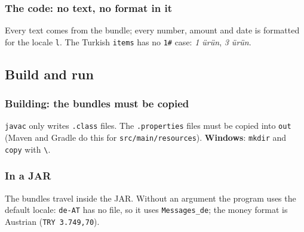 \documentclass[aspectratio=169,10pt,compress]{beamer}
\newcommand{\win}{\textbf{Windows}}
\begin{document}
\begin{frame}[t,fragile] \frametitle{The code: no text, no format in it}
  \vspace{0.1em}
  \small Every text comes from the bundle; every number, amount and date is formatted for the locale \texttt{l}.
  The Turkish \texttt{items} has no \texttt{1\#} case: \emph{1 ürün}, \emph{3 ürün}.
\end{frame}

\subsection[Build]{Build and run}




\begin{frame}[t,fragile] \frametitle{Building: the bundles must be copied}

  \vspace{0.1em}
  \small
  \texttt{javac} only writes \texttt{.class} files. The \texttt{.properties} files must be copied into \texttt{out}
  (Maven and Gradle do this for \texttt{src/main/resources}). \win: \texttt{mkdir} and \texttt{copy} with \texttt{\textbackslash}.
\end{frame}




\begin{frame}[t,fragile] \frametitle{In a JAR}

  \vspace{0.1em}
  \small
  The bundles travel inside the JAR. Without an argument the program uses the default locale:
  \texttt{de-AT} has no file, so it uses \texttt{Messages\_de}; the money format is Austrian (\texttt{TRY 3.749,70}).
\end{frame}

\end{document}
